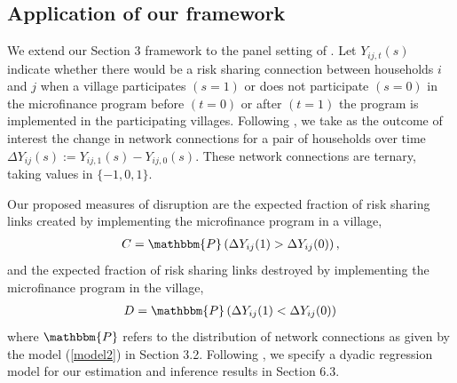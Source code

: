 \documentclass[12pt]{article}
\theoremstyle{definition}
\begin{document}
\subsection{Application of our framework}
We extend our Section 3 framework to the panel setting of \cite{banerjee2021changes}. Let $Y_{ij,t}(s)$ indicate whether there would be a risk sharing connection between households $i$ and $j$ when a village participates $(s = 1)$ or does not participate $(s = 0)$ in the microfinance program before $(t = 0)$ or after $(t = 1)$ the program is implemented in the participating villages. Following \cite{banerjee2021changes}, we take as the outcome of interest the change in network connections for a pair of households over time $\Delta Y_{ij}(s) := Y_{ij,1}(s) - Y_{ij,0}(s)$. These network connections are ternary, taking values in $\{-1,0,1\}$.  


Our proposed measures of disruption are the expected fraction of risk sharing links created by implementing the microfinance program in a village,
\begin{align*}
C = \mathbbm{P}\left(\Delta Y_{ij}(1) > \Delta Y_{ij}(0)\right),
\end{align*}
and the expected fraction of risk sharing links destroyed by implementing the microfinance program in the village, 
\begin{align*}
D = \mathbbm{P}\left(\Delta Y_{ij}(1) < \Delta Y_{ij}(0)\right)
\end{align*}
where $\mathbbm{P}$ refers to the distribution of network connections as given by the model (\ref{model2}) in Section 3.2. Following \cite{banerjee2021changes}, we specify a dyadic regression model for our estimation and inference results in Section 6.3. 
\end{document}
